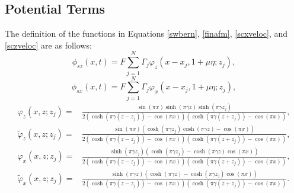 \documentclass[a4paper,11pt]{article}
\begin{document}
\subsection{Potential Terms \label{poterms}}
The definition of the functions in Equations \eqref{swbern}, \eqref{finafm}, \eqref{scxveloc}, and \eqref{sczveloc}  are as follows:
\[
\phi_{sz}(x,t) =  F\sum_{j=1}^{N} \Gamma_{j}\varphi_{z}(x-x_{j},1+\mu \eta;z_{j}),
\]
\[
\phi_{sx}(x,t) = F\sum_{j=1}^{N}\Gamma_{j}\varphi_{x}(x-x_{j},1+\mu \eta;z_{j}),
\]
\begin{align*}
\varphi_{z}(x,z;z_{j}) = & \frac{\sin(\pi x)\sinh(\pi \gamma z)\sinh(\pi \gamma z_{j})}{2\left(\cosh(\pi\gamma(z-z_{j}))-\cos(\pi x)\right) \left(\cosh(\pi\gamma(z+z_{j}))-\cos(\pi x)\right)},\\
\tilde{\varphi}_{z}(x,z;z_{j}) = & \frac{\sin(\pi x)\left(\cosh(\pi \gamma z_{j})\cosh(\pi \gamma z)-\cos(\pi x)\right)}{2\left(\cosh(\pi\gamma(z-z_{j}))-\cos(\pi x)\right) \left(\cosh(\pi\gamma(z+z_{j}))-\cos(\pi x)\right)},\\
\varphi_{x}(x,z;z_{j}) = & \frac{\sinh(\pi \gamma z_{j})\left(\cosh(\pi \gamma z_{j})-\cosh(\pi \gamma z)\cos(\pi x)\right)}{2\left(\cosh(\pi\gamma(z-z_{j}))-\cos(\pi x)\right) \left(\cosh(\pi\gamma(z+z_{j}))-\cos(\pi x)\right)},\\
\tilde{\varphi}_{x}(x,z;z_{j}) = & \frac{\sinh(\pi \gamma z)(\cosh(\pi\gamma z) -\cosh(\pi \gamma z_{j})\cos(\pi x) )}{2(\cosh(\pi\gamma(z-z_{j}))-\cos(\pi x))(\cosh(\pi\gamma(z+z_{j}))-\cos(\pi x))}.
\end{align*}
\end{document}
